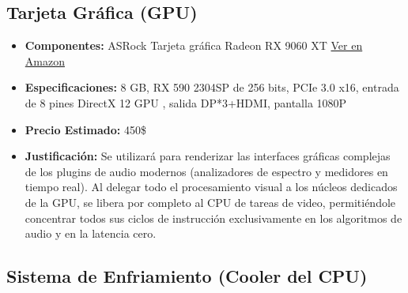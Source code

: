 \documentclass[12pt,a4paper]{article}
\begin{document}
\subsection{Tarjeta Gráfica (GPU)}
\begin{itemize}
    \item \textbf{Componentes:} ASRock Tarjeta gráfica Radeon RX 9060 XT
    \href{https://www.amazon.com/-/es/ASRock-9060-Challenger-16GB-Enfriamiento/dp/B0F8B59WP7/ref=sr_1_2?__mk_es_US=%C3%85M%C3%85%C5%BD%C3%95%C3%91&crid=3MRX2PWBHWSTE&dib=eyJ2IjoiMSJ9.dWwJ0w8hBfD_UKsGjgSfR7ii3aFPDuf4RMvcGBpeqGLZouyWBs795HD5axzBCLQ0tb7mKy_-kyv2WrsIuvIutHGfhmTQ7NAWpvTaShTxhByc0J9oDp7tHBuSaosqrWws2AGPGw411QlA2ujHkKSEgnBmoLjYtn2SZardzgxcXJbUhy0ThVwyLTQ19oe3DSIOSDWTvEH91ygDWsCjHZeqfBQVFdt2B9e1xz8z6g9qGc8.7FZE3GXLdYsppTklz0sU-qxvAhr_-mTsQ6SRF57tte8&dib_tag=se&keywords=tarjeta%2Bgr%C3%A1fica%2B16%2BGB%2C&qid=1779562625&sprefix=tarjeta%2Bgr%C3%A1fica%2B16%2Bgb%2C%2Caps%2C336&sr=8-2&th=1}{Ver en Amazon}
    \item \textbf{Especificaciones:} 8 GB, RX 590 2304SP de 256 bits, PCIe 3.0 x16, entrada de 8 pines DirectX 12 GPU , salida DP*3+HDMI, pantalla 1080P
    \item \textbf{Precio Estimado:} 450\$
    \item \textbf{Justificación:} Se utilizará para renderizar las interfaces gráficas complejas de los plugins de audio modernos (analizadores de espectro y medidores en tiempo real). Al delegar todo el procesamiento visual a los núcleos dedicados de la GPU, se libera por completo al CPU de tareas de video, permitiéndole concentrar todos sus ciclos de instrucción exclusivamente en los algoritmos de audio y en la latencia cero.
\end{itemize}

\subsection{Sistema de Enfriamiento (Cooler del CPU)}
\end{document}
